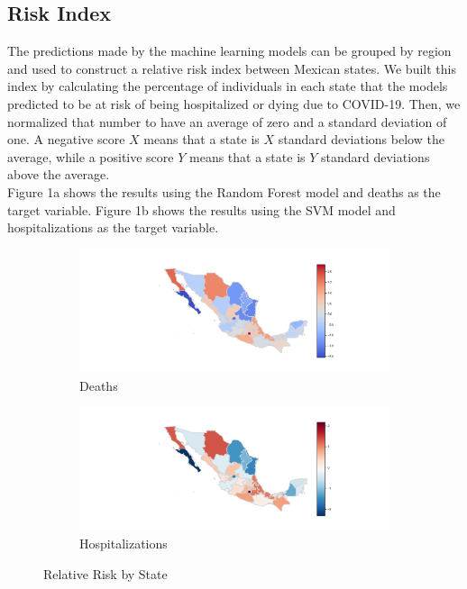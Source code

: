 \documentclass[hidelinks,10pt]{article}
\begin{document}
\subsection{Risk Index}
The predictions made by the machine learning models can be grouped by region and used to construct a relative risk index between Mexican states. We built this index by calculating the percentage of individuals in each state that the models predicted to be at risk of being hospitalized or dying due to COVID-19. Then, we normalized that number to have an average of zero and a standard deviation of one. A negative score $X$ means that a state is $X$ standard deviations below the average, while a positive score $Y$ means that a state is $Y$ standard deviations above the average.\\
Figure 1a shows the results using the Random Forest model and deaths as the target variable. Figure 1b shows the results using the SVM model and hospitalizations as the target variable.	
\begin{figure}[h]
	\centering
	\begin{subfigure}{.5\textwidth}
		\centering
		\includegraphics[width=1.1\linewidth]{map_risk_deaths}
		\caption{Deaths}
		\label{fig:sub1}
	\end{subfigure}%
	\begin{subfigure}{.5\textwidth}
		\centering
		\includegraphics[width=1.1\linewidth]{map_risk_hosp}
		\caption{Hospitalizations}
		\label{fig:sub2}
	\end{subfigure}
	\caption{Relative Risk by State}
	\label{fig:test}
\end{figure}
\end{document}
